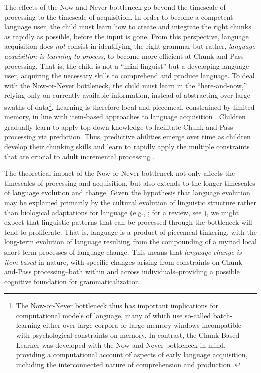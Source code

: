 \documentclass[output=paper]{langsci/langscibook}
\begin{document}
    The effects of the Now-and-Never bottleneck go beyond the timescale of processing to the timescale of acquisition. In order to become a competent language user, the child must learn how to create and integrate the right chunks as rapidly as possible, before the input is gone. From this perspective, language acquisition does \textit{not} consist in identifying the right grammar but rather, \textit{language acquisition is learning to process}, to become more efficient at Chunk-and-Pass processing. That is, the child is not a “mini-linguist” but a developing language user, acquiring the necessary skills to comprehend and produce language. To deal with the Now-or-Never bottleneck, the child must learn in the “here-and-now,” relying only on currently available information, instead of abstracting over large swaths of data\footnote{ The Now-or-Never bottleneck thus has important implications for computational models of language, many of which use so-called batch-learning either over large corpora \citep[e.g.,][]{Perfors2010} or large memory windows \citep[e.g.,][]{Kolodny2015} incompatible with psychological constraints on memory. In contrast, the Chunk-Based Learner \citep{McCauley2014,McCauley2016} was developed with the Now-and-Never bottleneck in mind, providing a computational account of aspects of early language acquisition, including the interconnected nature of comprehension and production \citep{ChaterLanguageInPress}.}. Learning is therefore local and piecemeal, constrained by limited memory, in line with item-based approaches to language acquisition \citep[e.g.,][]{Tomasello2003constructing}. Children gradually learn to apply top-down knowledge to facilitate Chunk-and-Pass processing via prediction. Thus, predictive abilities emerge over time as children develop their chunking skills and learn to rapidly apply the multiple constraints that are crucial to adult incremental processing \citep{Borovsky2012}.  

The theoretical impact of the Now-or-Never bottleneck not only affects the timescales of processing and acquisition, but also extends to the longer timescales of language evolution and change. Given the hypothesis that language evolution may be explained primarily by the cultural evolution of linguistic structure rather than biological adaptations for language  (e.g., \citealt{Christiansen2008,Hurford1999,Smith2008}; for a review, see \citealt{DediuEtAl2013}), we might expect that linguistic patterns that can be processed through the bottleneck will tend to proliferate. That is, language is a product of piecemeal tinkering, with the long-term evolution of language resulting from the compounding of a myriad local short-term processes of language change. This means that \textit{language change is item-based} in nature, with specific changes arising from constraints on Chunk-and-Pass processing--both within and across individuals--providing a possible cognitive foundation for grammaticalization.  
\end{document}
